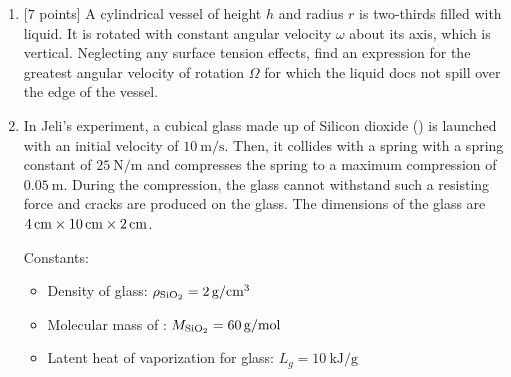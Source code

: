 \begin{enumerate}[align=left,start=1,label=\textbf{\textcolor{meared}{Problem \arabic*}}]
        The cube continuously emits red, blue, or green light on exactly three specific faces, with each such face emitting photons perpendicular to the face. He places the cube on a large flat frictionless surface with the face labelled \emph{2} facing directly north and face \emph{1} pointing upward. The cube moves without any external force and solely from emitting light at a power of \qty{20}{\watt} per light emitting face. Bala records its motion using his favorite Lenovo Thinkpad. When he starts the experiment, all of the light emitting faces emit red light. After $3$ hours, they all start emitting blue light, and then after $3$ hours again they all emit green light, and red light again and the loop repeats. After $7$ hours of the experiment, Bala measures that the cube has an instantaneous velocity of $v = \qty[per-mode = symbol]{0.848}{\meter\per\second}$, directly southeast. 
        \begin{enumerate}
            \item {[$2$ points]} Find all possible combinations of the $3$ light emitting faces.
            \item {[$4$ points]} What is the velocity of the cube after $5$ hours had elapsed since the start of the experiment?
        \end{enumerate}
    \item {[$7$ points]}  
        A cylindrical vessel of height $h$ and radius $r$ is two-thirds filled with liquid. It is rotated with constant angular velocity $\omega$ about its axis, which is vertical. Neglecting any surface tension effects, find an expression for the greatest angular velocity of rotation $\Omega$ for which the liquid docs not spill over the edge of the vessel.
    \item 
        In Jeli's experiment, a cubical glass made up of Silicon dioxide () is launched with an initial velocity of $\qty[per-mode = symbol]{10}{\meter\per\second}$. Then, it collides with a spring with a spring constant of $\qty[per-mode = symbol]{25}{\newton\per\meter}$ and compresses the spring to a maximum compression of $\qty[per-mode = symbol]{0.05}{\meter}$. During the compression, the glass cannot withstand such a resisting force and cracks are produced on the glass. The dimensions of the glass are $\qtyproduct{4 x 10 x 2}{\centi\meter}$.

        Constants:
        \begin{itemize}
            \item Density of glass: $\rho_{\ce{SiO_2}} = \qty[per-mode = symbol]{2}{\gram\per\centi\meter\tothe{3}}$
            \item Molecular mass of : $M_{\ce{SiO_2}} = \qty[per-mode = symbol]{60}{\gram\per\mole}$
            \item Latent heat of vaporization for glass: $L_g = \qty[per-mode = symbol]{10}{\kilo\joule\per\gram}$
        \end{itemize}


\end{enumerate}
